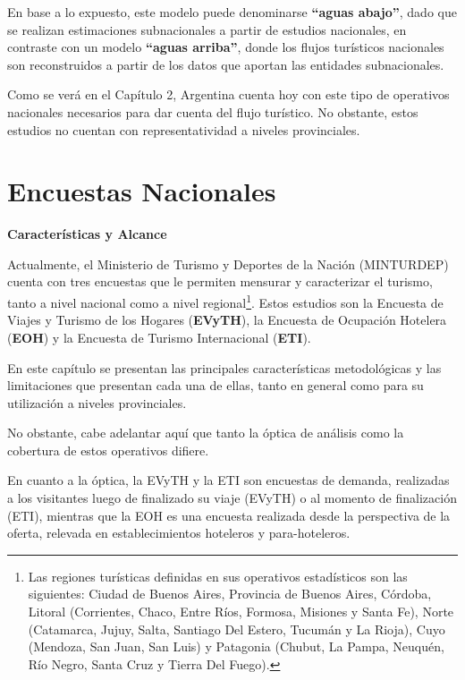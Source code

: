 \documentclass[
  openany]{book}
\begin{document}
En base a lo expuesto, este modelo puede denominarse \textbf{``aguas abajo''}, dado que se realizan estimaciones subnacionales a partir de estudios nacionales, en contraste con un modelo \textbf{``aguas arriba''}, donde los flujos turísticos nacionales son reconstruidos a partir de los datos que aportan las entidades subnacionales.

Como se verá en el Capítulo 2, Argentina cuenta hoy con este tipo de operativos nacionales necesarios para dar cuenta del flujo turístico. No obstante, estos estudios no cuentan con representatividad a niveles provinciales.

\hypertarget{encuestas-nacionales}{%
\chapter{\texorpdfstring{\textbf{Encuestas Nacionales}}{Encuestas Nacionales}}\label{encuestas-nacionales}}

\textbf{Características y Alcance}

Actualmente, el Ministerio de Turismo y Deportes de la Nación (MINTURDEP) cuenta con tres encuestas que le permiten mensurar y caracterizar el turismo, tanto a nivel nacional como a nivel regional\footnote{Las regiones turísticas definidas en sus operativos estadísticos son las siguientes: Ciudad de Buenos Aires, Provincia de Buenos Aires, Córdoba, Litoral (Corrientes, Chaco, Entre Ríos, Formosa, Misiones y Santa Fe), Norte (Catamarca, Jujuy, Salta, Santiago Del Estero, Tucumán y La Rioja), Cuyo (Mendoza, San Juan, San Luis) y Patagonia (Chubut, La Pampa, Neuquén, Río Negro, Santa Cruz y Tierra Del Fuego).}. Estos estudios son la Encuesta de Viajes y Turismo de los Hogares (\textbf{EVyTH}), la Encuesta de Ocupación Hotelera (\textbf{EOH}) y la Encuesta de Turismo Internacional (\textbf{ETI}).

En este capítulo se presentan las principales características metodológicas y las limitaciones que presentan cada una de ellas, tanto en general como para su utilización a niveles provinciales.

No obstante, cabe adelantar aquí que tanto la óptica de análisis como la cobertura de estos operativos difiere.

En cuanto a la óptica, la EVyTH y la ETI son encuestas de demanda, realizadas a los visitantes luego de finalizado su viaje (EVyTH) o al momento de finalización (ETI), mientras que la EOH es una encuesta realizada desde la perspectiva de la oferta, relevada en establecimientos hoteleros y para-hoteleros.
\end{document}
